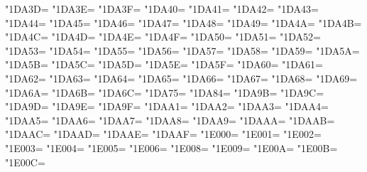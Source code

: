 \XeTeXcharclass"1DA3D=\KclassCM
\XeTeXcharclass"1DA3E=\KclassCM
\XeTeXcharclass"1DA3F=\KclassCM
\XeTeXcharclass"1DA40=\KclassCM
\XeTeXcharclass"1DA41=\KclassCM
\XeTeXcharclass"1DA42=\KclassCM
\XeTeXcharclass"1DA43=\KclassCM
\XeTeXcharclass"1DA44=\KclassCM
\XeTeXcharclass"1DA45=\KclassCM
\XeTeXcharclass"1DA46=\KclassCM
\XeTeXcharclass"1DA47=\KclassCM
\XeTeXcharclass"1DA48=\KclassCM
\XeTeXcharclass"1DA49=\KclassCM
\XeTeXcharclass"1DA4A=\KclassCM
\XeTeXcharclass"1DA4B=\KclassCM
\XeTeXcharclass"1DA4C=\KclassCM
\XeTeXcharclass"1DA4D=\KclassCM
\XeTeXcharclass"1DA4E=\KclassCM
\XeTeXcharclass"1DA4F=\KclassCM
\XeTeXcharclass"1DA50=\KclassCM
\XeTeXcharclass"1DA51=\KclassCM
\XeTeXcharclass"1DA52=\KclassCM
\XeTeXcharclass"1DA53=\KclassCM
\XeTeXcharclass"1DA54=\KclassCM
\XeTeXcharclass"1DA55=\KclassCM
\XeTeXcharclass"1DA56=\KclassCM
\XeTeXcharclass"1DA57=\KclassCM
\XeTeXcharclass"1DA58=\KclassCM
\XeTeXcharclass"1DA59=\KclassCM
\XeTeXcharclass"1DA5A=\KclassCM
\XeTeXcharclass"1DA5B=\KclassCM
\XeTeXcharclass"1DA5C=\KclassCM
\XeTeXcharclass"1DA5D=\KclassCM
\XeTeXcharclass"1DA5E=\KclassCM
\XeTeXcharclass"1DA5F=\KclassCM
\XeTeXcharclass"1DA60=\KclassCM
\XeTeXcharclass"1DA61=\KclassCM
\XeTeXcharclass"1DA62=\KclassCM
\XeTeXcharclass"1DA63=\KclassCM
\XeTeXcharclass"1DA64=\KclassCM
\XeTeXcharclass"1DA65=\KclassCM
\XeTeXcharclass"1DA66=\KclassCM
\XeTeXcharclass"1DA67=\KclassCM
\XeTeXcharclass"1DA68=\KclassCM
\XeTeXcharclass"1DA69=\KclassCM
\XeTeXcharclass"1DA6A=\KclassCM
\XeTeXcharclass"1DA6B=\KclassCM
\XeTeXcharclass"1DA6C=\KclassCM
\XeTeXcharclass"1DA75=\KclassCM
\XeTeXcharclass"1DA84=\KclassCM
\XeTeXcharclass"1DA9B=\KclassCM
\XeTeXcharclass"1DA9C=\KclassCM
\XeTeXcharclass"1DA9D=\KclassCM
\XeTeXcharclass"1DA9E=\KclassCM
\XeTeXcharclass"1DA9F=\KclassCM
\XeTeXcharclass"1DAA1=\KclassCM
\XeTeXcharclass"1DAA2=\KclassCM
\XeTeXcharclass"1DAA3=\KclassCM
\XeTeXcharclass"1DAA4=\KclassCM
\XeTeXcharclass"1DAA5=\KclassCM
\XeTeXcharclass"1DAA6=\KclassCM
\XeTeXcharclass"1DAA7=\KclassCM
\XeTeXcharclass"1DAA8=\KclassCM
\XeTeXcharclass"1DAA9=\KclassCM
\XeTeXcharclass"1DAAA=\KclassCM
\XeTeXcharclass"1DAAB=\KclassCM
\XeTeXcharclass"1DAAC=\KclassCM
\XeTeXcharclass"1DAAD=\KclassCM
\XeTeXcharclass"1DAAE=\KclassCM
\XeTeXcharclass"1DAAF=\KclassCM
\XeTeXcharclass"1E000=\KclassCM
\XeTeXcharclass"1E001=\KclassCM
\XeTeXcharclass"1E002=\KclassCM
\XeTeXcharclass"1E003=\KclassCM
\XeTeXcharclass"1E004=\KclassCM
\XeTeXcharclass"1E005=\KclassCM
\XeTeXcharclass"1E006=\KclassCM
\XeTeXcharclass"1E008=\KclassCM
\XeTeXcharclass"1E009=\KclassCM
\XeTeXcharclass"1E00A=\KclassCM
\XeTeXcharclass"1E00B=\KclassCM
\XeTeXcharclass"1E00C=\KclassCM
